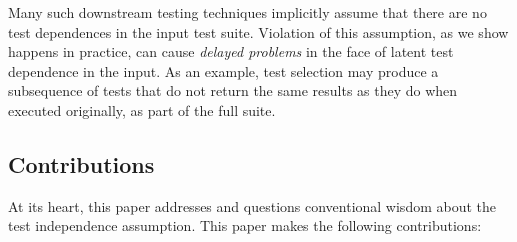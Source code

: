 Many such downstream testing techniques implicitly assume that
there are no test dependences in the input test suite.  Violation of
this assumption, as we show happens in practice, can cause \emph{delayed problems} in the face
of latent test dependence in the input.  As an
example, test selection may produce a subsequence of tests that do not
return the same results as they do when executed originally, as part of the full suite.


\subsection{Contributions}
\label{sec:contributions}

At its heart, this paper addresses and questions
conventional wisdom about the test independence assumption. 
This paper makes the following contributions:

